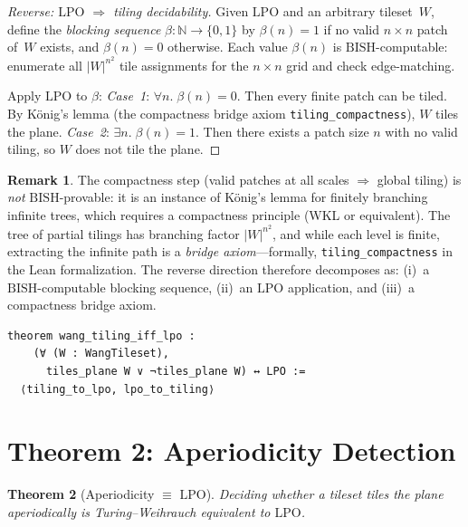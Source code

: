 \documentclass[11pt,a4paper]{article}
\theoremstyle{plain}
\newtheorem{theorem}{Theorem}[section]
\theoremstyle{definition}
\newtheorem{remark}[theorem]{Remark}
\newcommand{\NN}{\mathbb{N}}
\newcommand{\LPO}{\ensuremath{\mathrm{LPO}}}
\newcommand{\BISH}{\ensuremath{\mathrm{BISH}}}
\begin{document}
\begin{proof}[Reverse: \LPO{} $\Rightarrow$ tiling decidability]
Given \LPO{} and an arbitrary tileset~$W$, define the
\emph{blocking sequence} $\beta : \NN \to \{0,1\}$ by
$\beta(n) = 1$ if no valid $n{\times}n$ patch of~$W$ exists,
and $\beta(n) = 0$ otherwise.  Each value $\beta(n)$ is
$\BISH$-computable: enumerate all $|W|^{n^2}$ tile assignments
for the $n \times n$ grid and check edge-matching.

Apply \LPO{} to $\beta$:
\emph{Case~1}: $\forall n.\; \beta(n) = 0$.
Then every finite patch can be tiled.  By K\"onig's lemma
(the compactness bridge axiom \texttt{tiling\_compactness}),
$W$ tiles the plane.
\emph{Case~2}: $\exists n.\; \beta(n) = 1$.
Then there exists a patch size $n$ with no valid tiling,
so $W$ does not tile the plane.
\end{proof}

\begin{remark}
The compactness step (valid patches at all scales $\Rightarrow$
global tiling) is \emph{not} $\BISH$-provable: it is an instance
of K\"onig's lemma for finitely branching infinite trees, which
requires a compactness principle (WKL or equivalent).
The tree of partial tilings has branching factor $|W|^{n^2}$, and
while each level is finite, extracting the infinite path is a
\emph{bridge axiom}---formally, \texttt{tiling\_compactness} in the
Lean formalization.  The reverse direction therefore decomposes as:
(i)~a $\BISH$-computable blocking sequence, (ii)~an \LPO{} application,
and (iii)~a compactness bridge axiom.
\end{remark}

\begin{lstlisting}[caption={Wang tiling $\leftrightarrow$ \LPO: \texttt{TilingDecision.lean}}]
theorem wang_tiling_iff_lpo :
    (∀ (W : WangTileset),
      tiles_plane W ∨ ¬tiles_plane W) ↔ LPO :=
  ⟨tiling_to_lpo, lpo_to_tiling⟩
\end{lstlisting}

\section{Theorem 2: Aperiodicity Detection}\label{sec:aperiodic}

\begin{theorem}[Aperiodicity $\equiv$ \LPO]\label{thm:aperiodic}
Deciding whether a tileset tiles the plane aperiodically is
Turing--Weihrauch equivalent to \LPO.
\end{theorem}
\end{document}

